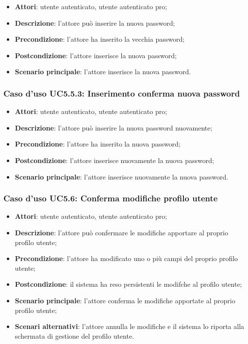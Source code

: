 \begin{itemize}
	\item \textbf{Attori}: utente autenticato, utente autenticato pro;
	\item \textbf{Descrizione}: l'attore può inserire la nuova password;
	\item \textbf{Precondizione}: l'attore ha inserito la vecchia password;
	\item \textbf{Postcondizione}: l'attore inserisce la nuova password;
	\item \textbf{Scenario principale}: l'attore inserisce la nuova password.
\end{itemize}

\subsubsection{Caso d'uso UC5.5.3: Inserimento conferma nuova password}

\begin{itemize}
	\item \textbf{Attori}: utente autenticato, utente autenticato pro;
	\item \textbf{Descrizione}: l'attore può inserire la nuova password nuovamente;
	\item \textbf{Precondizione}: l'attore ha inserito la nuova password;
	\item \textbf{Postcondizione}: l'attore inserisce nuovamente la nuova password;
	\item \textbf{Scenario principale}: l'attore inserisce nuovamente la nuova password.
\end{itemize}

\subsubsection{Caso d'uso UC5.6: Conferma modifiche profilo utente}

\begin{itemize}
	\item \textbf{Attori}: utente autenticato, utente autenticato pro;
	\item \textbf{Descrizione}: l'attore può confermare le modifiche apportare al proprio profilo utente; 
	\item \textbf{Precondizione}: l'attore ha modificato uno o più campi del proprio profilo utente;
	\item \textbf{Postcondizione}: il sistema ha reso persistenti le modifche al profilo utente;
	\item \textbf{Scenario principale}: l'attore conferma le modifiche apportate al proprio profilo utente;
	\item \textbf{Scenari alternativi}: l'attore annulla le modifiche e il sistema lo riporta alla schermata di gestione del profilo utente.
\end{itemize}

